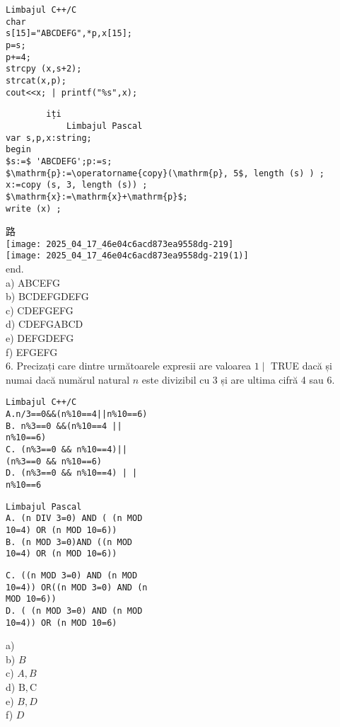 \begin{verbatim}
Limbajul C++/C
char
s[15]="ABCDEFG",*p,x[15];
p=s;
p+=4;
strcpy (x,s+2);
strcat(x,p);
cout<<x; | printf("%s",x);
\end{verbatim}

\begin{verbatim}
        iți
            Limbajul Pascal
var s,p,x:string;
begin
$s:=$ 'ABCDEFG';p:=s;
$\mathrm{p}:=\operatorname{copy}(\mathrm{p}, 5$, length (s) ) ;
x:=copy (s, 3, length (s)) ;
$\mathrm{x}:=\mathrm{x}+\mathrm{p}$;
write (x) ;
\end{verbatim}

路\\
\texttt{[image: 2025\_04\_17\_46e04c6acd873ea9558dg-219]}\\
\texttt{[image: 2025\_04\_17\_46e04c6acd873ea9558dg-219(1)]}\\
end.\\
a) ABCEFG\\
b) BCDEFGDEFG\\
c) CDEFGEFG\\
d) CDEFGABCD\\
e) DEFGDEFG\\
f) EFGEFG\\
6. Precizați care dintre următoarele expresii are valoarea $1 \mid$ TRUE dacă și numai dacă numărul natural $n$ este divizibil cu 3 și are ultima cifră 4 sau 6.

\begin{verbatim}
Limbajul C++/C
A.n/3==0&&(n%10==4||n%10==6)
B. n%3==0 &&(n%10==4 ||
n%10==6)
C. (n%3==0 && n%10==4)||
(n%3==0 && n%10==6)
D. (n%3==0 && n%10==4) | |
n%10==6
\end{verbatim}

\begin{verbatim}
Limbajul Pascal
A. (n DIV 3=0) AND ( (n MOD
10=4) OR (n MOD 10=6))
B. (n MOD 3=0)AND ((n MOD
10=4) OR (n MOD 10=6))
\end{verbatim}

\begin{verbatim}
C. ((n MOD 3=0) AND (n MOD
10=4)) OR((n MOD 3=0) AND (n
MOD 10=6))
D. ( (n MOD 3=0) AND (n MOD
10=4)) OR (n MOD 10=6)
\end{verbatim}

a)\\
b) $B$\\
c) $A, B$\\
d) $\mathrm{B}, \mathrm{C}$\\
e) $B, D$\\
f) $D$

